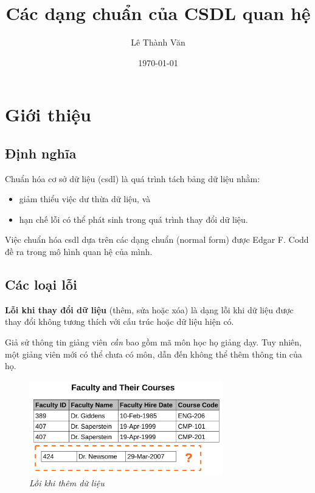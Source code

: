 \documentclass[11pt]{beamer}
\author{Lê Thành Văn}
\title{Các dạng chuẩn của CSDL quan hệ}
\institute{Khoa Hệ thống thông tin quản lý}
\date{\today}
\begin{document}
\begin{frame}
  \titlepage
\end{frame}

\section{Giới thiệu}
\subsection{Định nghĩa}
\begin{frame}
  Chuẩn hóa cơ sở dữ liệu (csdl) là quá trình tách bảng dữ liệu nhằm:
  \begin{itemize}
    \item giảm thiểu việc dư thừa dữ liệu, và
    \item hạn chế lỗi có thể phát sinh trong quá trình thay đổi dữ liệu.
  \end{itemize}
\end{frame}

\begin{frame}
  Việc chuẩn hóa csdl dựa trên các dạng chuẩn (normal form) được Edgar F. Codd
  đề ra trong mô hình quan hệ của mình.
\end{frame}
\subsection{Các loại lỗi}
\begin{frame}
  \textbf{Lỗi khi thay đổi dữ liệu} (thêm, sửa hoặc xóa) là dạng lỗi khi dữ liệu được thay đổi không tương thích 
  với cấu trúc hoặc dữ liệu hiện có.
\end{frame}

\begin{frame}
  Giả sử thông tin giảng viên \textit{cần} bao gồm mã môn học họ giảng dạy.
  Tuy nhiên, một giảng viên mới có thể chưa có môn, dẫn đến không thể thêm thông tin của họ.

  \begin{figure}
    \includegraphics[width=0.75\textwidth]{COS212/ia.png}
    \caption{\textit{Lỗi khi thêm dữ liệu}}
  \end{figure}
\end{frame}
\end{document}
